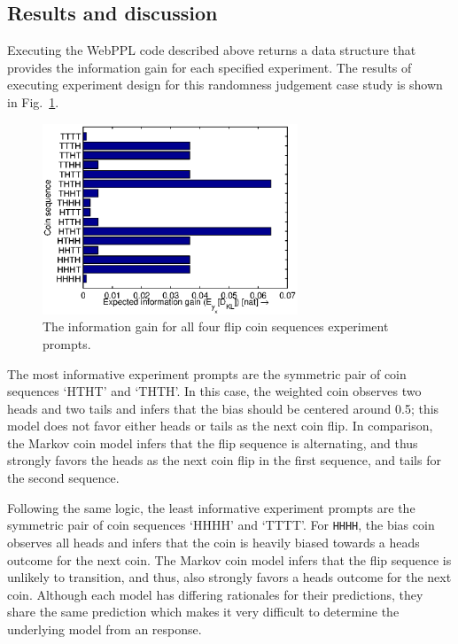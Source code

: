 \documentclass{article}
\begin{document}
\subsection{Results and discussion}
%
Executing the WebPPL code described above returns a data structure that provides the information gain for each specified experiment. The results of executing experiment design for this randomness judgement case study is shown in Fig.~\ref{fig:coin}.

\begin{figure}[h!]
\centering
\includegraphics[width=3in]{img/coin.eps}
\caption{The information gain for all four flip coin sequences experiment prompts.}
\label{fig:coin}
\end{figure}

The most informative experiment prompts are the symmetric pair of coin sequences `HTHT' and `THTH'. 
In this case, the weighted coin observes two heads and two tails and infers that the bias should be centered around 0.5; this model does not favor either heads or tails as the next coin flip. 
In comparison, the Markov coin model infers that the flip sequence is alternating, and thus strongly favors the heads as the next coin flip in the first sequence, and tails for the second sequence. 

Following the same logic, the least informative experiment prompts are the symmetric pair of coin sequences `HHHH' and `TTTT'. 
For \lstinline{HHHH}, the bias coin observes all heads and infers that the coin is heavily biased towards a heads outcome for the next coin. 
The Markov coin model infers that the flip sequence is unlikely to transition, and thus, also strongly favors a heads outcome for the next coin. 
Although each model has differing rationales for their predictions, they share the same prediction which makes it very difficult to determine the underlying model from an response.
\end{document}

